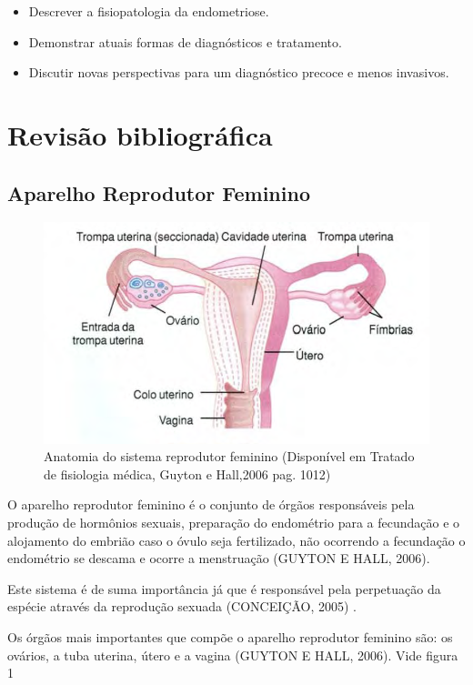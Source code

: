 \documentclass[12pt]{article} %
\begin{document}
\begin{itemize}
\item Descrever a fisiopatologia da endometriose.
\item Demonstrar atuais formas de diagnósticos e tratamento.
\item Discutir novas perspectivas para um diagnóstico precoce e menos
invasivos.
\end{itemize}


\section{Revisão bibliográfica}

\subsection{Aparelho Reprodutor Feminino}
\begin{figure}[h!]
\centering
\includegraphics[width=13.9cm]{utero.png}
\caption[Anatomia do sistema reprodutor feminino]{Anatomia do sistema reprodutor feminino (Disponível em Tratado de fisiologia médica, Guyton e Hall,2006 pag. 1012)}
\label{fig:aparelho feminino}
\end{figure}

O aparelho reprodutor feminino é o conjunto de órgãos responsáveis
pela produção de hormônios sexuais, preparação do
endométrio para a fecundação e o alojamento do embrião caso o óvulo seja
fertilizado, não ocorrendo a fecundação o endométrio se descama e ocorre a menstruação (GUYTON E HALL, 2006). 

Este sistema é de suma
importância já que é responsável pela perpetuação da espécie através
da reprodução sexuada (CONCEIÇÃO, 2005) .

Os órgãos mais importantes que compõe o
aparelho reprodutor feminino são: os ovários, a tuba uterina, útero e
a vagina (GUYTON E HALL, 2006). Vide figura 1
\end{document}
